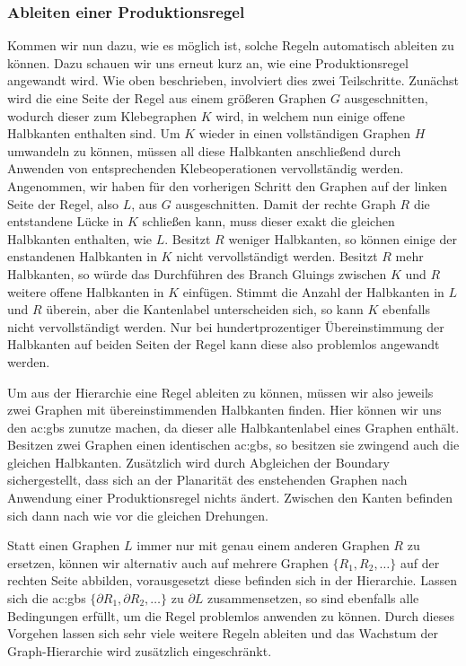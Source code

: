 \subsubsection{Ableiten einer Produktionsregel}
Kommen wir nun dazu, wie es möglich ist, solche Regeln automatisch ableiten zu können. Dazu schauen wir uns erneut kurz an, wie eine Produktionsregel
angewandt wird. Wie oben beschrieben, involviert dies zwei Teilschritte. Zunächst wird die eine Seite der Regel aus einem größeren Graphen \(G\)
ausgeschnitten, wodurch dieser zum Klebegraphen \(K\) wird, in welchem nun einige offene Halbkanten enthalten sind. Um \(K\) wieder in einen vollständigen
Graphen \(H\) umwandeln zu können,
müssen all diese Halbkanten anschließend durch Anwenden von entsprechenden Klebeoperationen vervollständig werden. Angenommen, wir haben für den
vorherigen Schritt den Graphen auf der linken Seite der Regel, also \(L\), aus \(G\) ausgeschnitten. Damit der rechte Graph \(R\) die entstandene
Lücke in \(K\) schließen kann, muss dieser exakt die gleichen Halbkanten enthalten, wie \(L\). Besitzt \(R\) weniger Halbkanten, so können einige
der enstandenen Halbkanten in \(K\) nicht vervollständigt werden. Besitzt \(R\) mehr Halbkanten, so würde das Durchführen des Branch Gluings zwischen
\(K\) und \(R\) weitere offene Halbkanten in \(K\) einfügen. Stimmt die Anzahl der Halbkanten in \(L\) und \(R\) überein, aber die Kantenlabel
unterscheiden sich, so kann \(K\) ebenfalls nicht vervollständigt werden. Nur bei hundertprozentiger Übereinstimmung der Halbkanten auf beiden Seiten
der Regel kann diese also problemlos angewandt werden.

Um aus der Hierarchie eine Regel ableiten zu können, müssen wir also jeweils zwei Graphen mit übereinstimmenden Halbkanten finden. Hier können wir uns
den \gls{ac:gbs} zunutze machen, da dieser alle Halbkantenlabel eines Graphen enthält. Besitzen zwei Graphen einen identischen \gls{ac:gbs}, so besitzen
sie zwingend auch die gleichen Halbkanten. Zusätzlich wird durch Abgleichen der Boundary sichergestellt, dass sich an der Planarität des enstehenden
Graphen nach Anwendung einer Produktionsregel nichts ändert. Zwischen den Kanten befinden sich dann nach wie vor die gleichen Drehungen.

Statt einen Graphen \(L\) immer nur mit genau einem anderen Graphen \(R\) zu ersetzen, können wir alternativ auch auf mehrere Graphen \(\{R_1, R_2, \dots\}\)
auf der rechten Seite abbilden, vorausgesetzt diese befinden sich in der Hierarchie. Lassen sich die \gls{ac:gbs} \(\{\partial R_1, \partial R_2, \dots\}\)
zu \(\partial L\) zusammensetzen, so sind ebenfalls alle Bedingungen erfüllt, um die Regel problemlos anwenden zu können. Durch dieses Vorgehen lassen sich
sehr viele weitere Regeln ableiten und das Wachstum der Graph-Hierarchie wird zusätzlich eingeschränkt.


